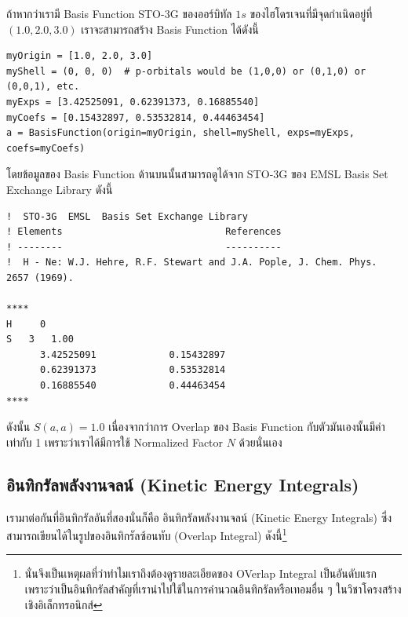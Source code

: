 ถ้าหากว่าเรามี Basis Function STO-3G ของออร์บิทัล $1s$ ของไฮโดรเจนที่มีจุดกำเนิดอยู่ที่ $(1.0, 2.0, 3.0)$ เราจะสามารถสร้าง Basis
Function ได้ดังนี้

\vspace{5pt}

\begin{lstlisting}[style=MyPython]
myOrigin = [1.0, 2.0, 3.0]
myShell = (0, 0, 0)  # p-orbitals would be (1,0,0) or (0,1,0) or (0,0,1), etc.
myExps = [3.42525091, 0.62391373, 0.16885540]
myCoefs = [0.15432897, 0.53532814, 0.44463454]
a = BasisFunction(origin=myOrigin, shell=myShell, exps=myExps, coefs=myCoefs)
\end{lstlisting}

\vspace{5pt}

\noindent โดยข้อมูลของ Basis Function ด้านบนนั้นสามารถดูได้จาก STO-3G ของ EMSL Basis Set Exchange Library ดังนี้

\vspace{5pt}

\begin{lstlisting}
!  STO-3G  EMSL  Basis Set Exchange Library 
! Elements                             References
! --------                             ----------
!  H - Ne: W.J. Hehre, R.F. Stewart and J.A. Pople, J. Chem. Phys. 2657 (1969).

****
H     0 
S   3   1.00
      3.42525091             0.15432897       
      0.62391373             0.53532814       
      0.16885540             0.44463454       
****
\end{lstlisting}

\vspace{5pt}

ดังนั้น $S(a,a) = 1.0$ เนื่องจากว่าการ Overlap ของ Basis Function กับตัวมันเองนั้นมีค่าเท่ากับ 1 เพราะว่าเราได้มีการใช้ Normalized
Factor $N$ ด้วยนั่นเอง

\subsection{อินทิกรัลพลังงานจลน์ (Kinetic Energy Integrals)}

เรามาต่อกันที่อินทิกรัลอันที่สองนั่นก็คือ อินทิกรัลพลังงานจลน์ (Kinetic Energy Integrals) ซึ่งสามารถเขียนได้ในรูปของอินทิกรัลซ้อนทับ
(Overlap Integral) ดังนี้\footnote{นั่นจึงเป็นเหตุผลที่ว่าทำไมเราถึงต้องดูรายละเอียดของ OVerlap Integral เป็นอันดับแรก
  เพราะว่าเป็นอินทิกรัลสำคัญที่เรานำไปใช้ในการคำนวณอินทิกรัลหรือเทอมอื่น ๆ ในวิชาโครงสร้างเชิงอิเล็กทรอนิกส์}

